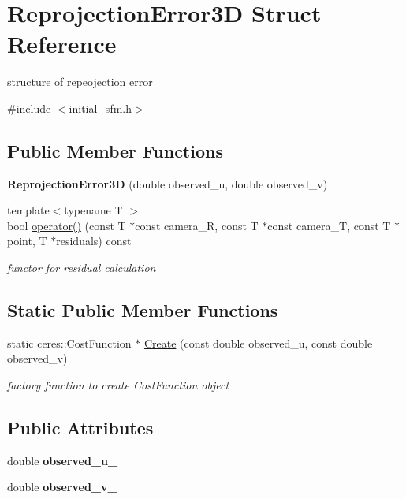 \hypertarget{structReprojectionError3D}{}\section{Reprojection\+Error3D Struct Reference}
\label{structReprojectionError3D}


structure of repeojection error  




{\ttfamily \#include $<$initial\+\_\+sfm.\+h$>$}

\subsection*{Public Member Functions}
\begin{DoxyCompactItemize}
\item 
\mbox{\label{structReprojectionError3D_abb8446263a017ee34afc29be2e1c4c09}} 
{\bfseries Reprojection\+Error3D} (double observed\+\_\+u, double observed\+\_\+v)
\item 
{\footnotesize template$<$typename T $>$ }\\bool \hyperlink{structReprojectionError3D_a7cbde2912c71ddefcf084788ce649e9a}{operator()} (const T $\ast$const camera\+\_\+R, const T $\ast$const camera\+\_\+T, const T $\ast$point, T $\ast$residuals) const
\begin{DoxyCompactList}\small\item\em functor for residual calculation \end{DoxyCompactList}\end{DoxyCompactItemize}
\subsection*{Static Public Member Functions}
\begin{DoxyCompactItemize}
\item 
static ceres\+::\+Cost\+Function $\ast$ \hyperlink{structReprojectionError3D_adb37d081c013ea177b2fb3a26d9e7aab}{Create} (const double observed\+\_\+u, const double observed\+\_\+v)
\begin{DoxyCompactList}\small\item\em factory function to create Cost\+Function object \end{DoxyCompactList}\end{DoxyCompactItemize}
\subsection*{Public Attributes}
\begin{DoxyCompactItemize}
\item 
\mbox{\label{structReprojectionError3D_a152397137c2f3919d9e030a671e0534d}} 
double {\bfseries observed\+\_\+u\+\_\+}
\item 
\mbox{\label{structReprojectionError3D_a3e41c8b9db195ac3961ca785b3ea4c06}} 
double {\bfseries observed\+\_\+v\+\_\+}
\end{DoxyCompactItemize}


